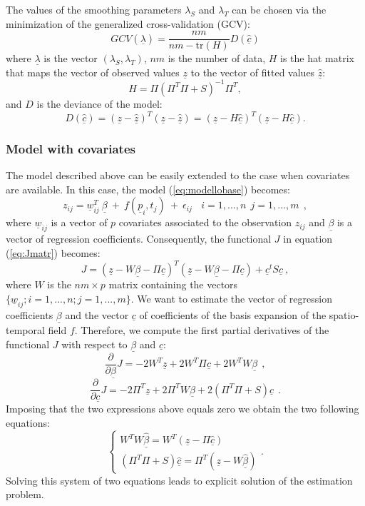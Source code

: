 \documentclass[a4paper,11pt,twoside,openright]{book}							%
\begin{document}
The values of the smoothing parameters $\lambda_S$ and $\lambda_T$ can be chosen via the minimization of the generalized cross-validation (GCV):
$$ GCV(\underline \lambda) =\frac{nm}{nm-\text{tr}(H)}  D(\hat  {\underline c}) $$
where $\underline \lambda$ is the vector $ (\lambda_S,\lambda_T) $, $nm$ is the number of data, $H$ is the hat matrix that maps the vector of observed values $\underline z$ to the vector of fitted values $\hat  {\underline z}$:
$$ H = \Pi (\Pi^T \Pi + S)^{-1}\Pi^T ,$$
and $D$ is the deviance of the model:
$$  D(\hat  {\underline c}) = (\underline z - \hat  {\underline z})^T(\underline z - \hat  {\underline z}) = (\underline z - H \hat  {\underline c})^T(\underline z - H \hat  {\underline c}).$$


\subsubsection*{Model with covariates}

The model described above can be easily extended to the case when covariates are available.
In this case, the model (\ref{eq:modellobase}) becomes:
$$ z_{ij}= \underline w_{ij}^T\  \underline \beta   \ + \  f(\underline p_i,t_j)\ +\ \epsilon_{ij}\ \ \ \ i = 1,...,n\ \ j=1,...,m \ \ ,$$
where $\underline w_{ij}$ is a vector of $p$ covariates associated to the observation $z_{ij}$ and $\underline \beta$ is a vector of regression coefficients.
Consequently, the functional $J$ in equation (\ref{eq:Jmatr}) becomes:
$$ J = (\underline z - W \underline \beta - \Pi \underline c)^T (\underline z - W \underline \beta - \Pi \underline c) + \underline c^t S \underline c  \ ,$$
where $W$ is the $nm \times p$ matrix containing the vectors $ \{\underline w_{ij}; i=1,...,n;j=1,...,m\}$.
We want to estimate the vector of regression coefficients $\underline \beta$ and the vector $\underline c$ of coefficients of the basis expansion of the spatio-temporal field $f$. Therefore, we compute the first partial derivatives of the functional $J$ with respect to $\underline \beta$ and $\underline c$:
$$
\frac{\partial}{\partial \underline \beta}J= -2W^T \underline z + 2W^T \Pi \underline c + 2 W^TW \underline \beta \ \ ,
$$
$$
\frac{\partial}{\partial \underline c}J= -2 \Pi^T \underline z + 2 \Pi^T W \underline \beta + 2(\Pi^T \Pi + S) \underline c \ \ .
$$
Imposing that the two expressions above equals zero we obtain the two following equations:
$$
\begin{cases}
W^TW \hat{\underline \beta} = W^T(\underline z - \Pi \hat{\underline c})  \\
(\Pi^T \Pi + S) \hat{\underline c}=\Pi^T(\underline z -W \hat{\underline \beta})
\end{cases}.
$$
Solving this system of two equations leads to explicit solution of the estimation problem.
\end{document}
